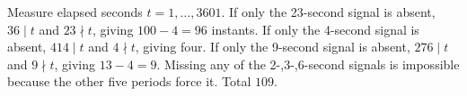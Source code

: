 Measure elapsed seconds $t=1,\ldots,3601$. If only the 23-second signal is absent, $36\mid t$ and $23\nmid t$, giving $100-4=96$ instants. If only the 4-second signal is absent, $414\mid t$ and $4\nmid t$, giving four. If only the 9-second signal is absent, $276\mid t$ and $9\nmid t$, giving $13-4=9$. Missing any of the 2-,3-,6-second signals is impossible because the other five periods force it. Total $\boxed{109}$.
